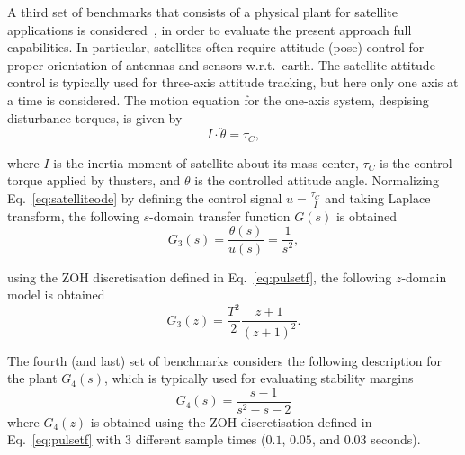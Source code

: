 \documentclass{sig-alternate-05-2015}
\begin{document}
A third set of benchmarks that consists of a physical plant for satellite
applications is considered~\cite{Franklin15}, in order to evaluate the
present approach full capabilities.  In particular, satellites often require
attitude (pose) control for proper orientation of antennas and sensors
w.r.t.~earth.  The satellite attitude control is typically used for
three-axis attitude tracking, but here only one axis at a time is
considered.  The motion equation for the one-axis system, despising
disturbance torques, is given by
%
\begin{equation}
\label{eq:satelliteode}
I\cdot \ddot{\theta} = \tau_{C},
\end{equation}

\noindent where $I$ is the inertia moment of satellite about its mass
center, $\tau_{C}$ is the control torque applied by thusters, and $\theta$
is the controlled attitude angle.  Normalizing Eq.~\eqref{eq:satelliteode}
by defining the control signal $u=\frac{\tau_{C}}{I}$ and taking Laplace
transform, the following $s$-domain transfer function $G(s)$ is obtained
%
\begin{equation}
\label{eq:satellitetf}
G_{3}(s)=\frac{\theta(s)}{u(s)}=\frac{1}{s^2},
\end{equation}

\noindent using the ZOH discretisation defined in Eq.~\eqref{eq:pulsetf}, 
the following $z$-domain model is obtained
%
\begin{equation}
G_{3}(z)= \frac{T^{2}}{2} \frac{z+1}{(z+1)^{2}}.
\end{equation}

%
%

The fourth (and last) set of benchmarks considers the following description
for the plant $G_{4}(s)$, which is typically used for evaluating stability
margins~\cite{bhattacharyya97, keel_Bhattacharyya_examples}
%
\begin{equation}
\label{exampleA}
G_{4}(s)=\frac{s-1}{s^{2}-s-2}
\end{equation}
%
\noindent where $G_{4}(z)$ is obtained using the ZOH discretisation defined 
in Eq.~\eqref{eq:pulsetf} with $3$ different sample times ($0.1$, $0.05$, and $0.03$ 
seconds).
\end{document}
